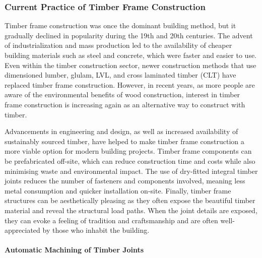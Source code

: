 \documentclass[11pt]{book}
\begin{document}
\subsubsection{Current Practice of Timber Frame Construction}

Timber frame construction was once the dominant building method, but it gradually declined in popularity during the 19th and 20th centuries. The advent of industrialization and mass production led to the availability of cheaper building materials such as steel and concrete, which were faster and easier to use. Even within the timber construction sector, newer construction methods that use dimensioned lumber, glulam, LVL, and cross laminated timber (CLT) have replaced timber frame construction. However, in recent years, as more people are aware of the environmental benefits of wood construction, interest in timber frame construction is increasing again as an alternative way to construct with timber. 

Advancements in engineering and design, as well as increased availability of sustainably sourced timber, have helped to make timber frame construction a more viable option for modern building projects. Timber frame components can be prefabricated off-site, which can reduce construction time and costs while also minimising waste and environmental impact. The use of dry-fitted integral timber joints reduces the number of fasteners and components involved, meaning less metal consumption and quicker installation on-site. Finally, timber frame structures can be aesthetically pleasing as they often expose the beautiful timber material and reveal the structural load paths. When the joint details are exposed, they can evoke a feeling of tradition and craftsmanship and are often well-appreciated by those who inhabit the building.

\paragraph{Automatic Machining of Timber Joints}
\end{document}
